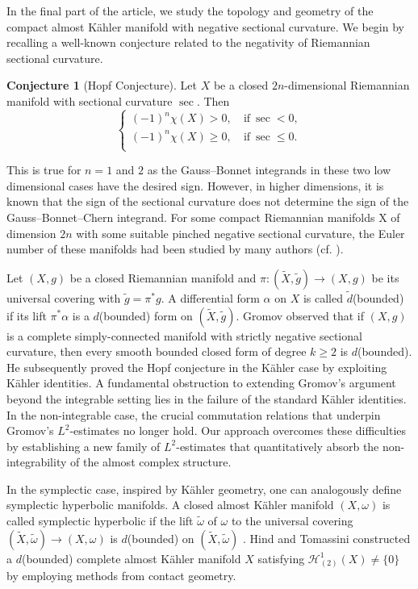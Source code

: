 \documentclass[12pt, twoside]{article}
\theoremstyle{definition}
\numberwithin{equation}{section}
\newtheorem{conjecture}{Conjecture}
\def \a {\alpha }
\def\w {\omega}
\begin{document}
In the final part of the article, we study the topology and geometry of the compact almost K\"{a}hler manifold with negative sectional curvature. We begin by recalling a well-known conjecture related to the negativity of Riemannian sectional curvature.
	\begin{conjecture}[Hopf Conjecture]
		Let $X$ be a closed $2n$-dimensional Riemannian manifold with sectional curvature $\sec$. Then
		\begin{equation*}
		\left\{
		\begin{aligned}
		(-1)^{n}\chi(X)>0, &\ \mathrm{if}\ \sec<0,\\
		(-1)^{n}\chi(X)\geq0,&\ \mathrm{if}\ \sec\leq0.\\
		\end{aligned}  
		\right.
		\end{equation*}	
	\end{conjecture}
	This is true for $n=1$ and $2$ as the Gauss–Bonnet integrands in these two low dimensional cases have the desired sign.
	 However, in higher dimensions, it is known that the sign of the sectional curvature does not determine the sign of the Gauss--Bonnet--Chern integrand.  For some compact Riemannian manifolds X of dimension $2n$ with some suitable pinched negative sectional curvature, the Euler number of these manifolds had been studied by many authors (cf. \cite{DX,JX}).
	
	
Let $(X, g)$ be a closed Riemannian manifold and $\pi:(\tilde{X},\tilde{g})\rightarrow(X,g)$ be its universal covering with $\tilde{g}=\pi^{\ast}g$. A differential form $\a$ on $X$ is called $\tilde{d}$(bounded) if its lift $\pi^{\ast}\a$ is a $d$(bounded) form on $(\tilde{X},\tilde{g})$. Gromov observed that if $(X,g)$ is a complete simply-connected manifold with strictly negative sectional curvature, then every smooth bounded closed form of degree $k\geq2$ is $d$(bounded). He subsequently proved the Hopf conjecture in the Kähler case by exploiting  Kähler identities. A fundamental obstruction to extending Gromov's argument beyond the integrable setting lies in the failure of the standard Kähler identities. In the non-integrable case, the crucial commutation relations that underpin Gromov's $L^{2}$-estimates no longer hold. Our approach overcomes these difficulties by establishing a new family of $L^{2}$-estimates that quantitatively absorb the non-integrability of the almost complex structure.
	
	In the symplectic case, inspired by Kähler geometry, one can analogously define symplectic hyperbolic manifolds. A closed almost K\"{a}hler manifold $(X,\w)$ is called symplectic hyperbolic if the lift $\tilde{\w}$ of $\w$ to the universal covering $(\tilde{X},\tilde{\w})\rightarrow(X,\w)$ is $d$(bounded)  on $(\tilde{X},\tilde{\w})$ \cite{Hua22,Hua23}. Hind and Tomassini \cite{HT} constructed a $d$(bounded) complete almost K\"{a}hler manifold $X$ satisfying $\mathcal{H}^{1}_{(2)}(X)\neq\{0\}$  by employing methods from  contact geometry. 
	
\end{document}
